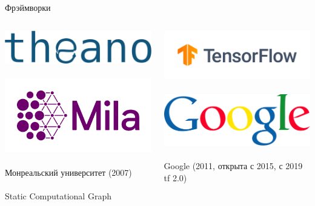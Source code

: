 \documentclass[notes,12pt, aspectratio=169]{beamer}
\begin{document}
\begin{frame}{Фрэймворки}
\begin{columns}[T] %
	\begin{column}{.33\textwidth}
		\centering 	\includegraphics[width=.6\linewidth]{theano.png} \\
		\mbox{ } \\
		\centering 	\includegraphics[width=.6\linewidth]{Logo_Mila.png} \\
		\mbox{ } \\
		Монреальский университет (2007) \\
		\mbox{ } \\
		Static Computational Graph
	\end{column}%
	\hfill%
	\begin{column}{.33\textwidth}
		\centering 	\includegraphics[width=.7\linewidth]{tensorflow.png} \\
		\mbox{ } \\
		\centering 	\includegraphics[width=.6\linewidth]{google.png} \\
		\mbox{ } \\
		Google (2011, открыта с 2015, с 2019 tf 2.0) \\

\end{column}
\end{columns}
\end{frame}
\end{document}
